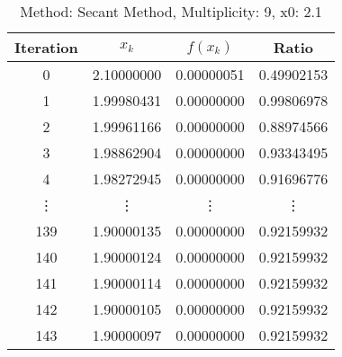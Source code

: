 \begin{table}
\centering
\caption{Method: Secant Method, Multiplicity: 9, x0: 2.1}
\label{tab:table_Secant_Method_9_2_1}
\begin{tabular}{c c c c}
\toprule
Iteration &      $x_k$ &   $f(x_k)$ &      Ratio \\
\midrule
        0 & 2.10000000 & 0.00000051 & 0.49902153 \\
        1 & 1.99980431 & 0.00000000 & 0.99806978 \\
        2 & 1.99961166 & 0.00000000 & 0.88974566 \\
        3 & 1.98862904 & 0.00000000 & 0.93343495 \\
        4 & 1.98272945 & 0.00000000 & 0.91696776 \\
   \vdots &     \vdots &     \vdots &     \vdots \\
      139 & 1.90000135 & 0.00000000 & 0.92159932 \\
      140 & 1.90000124 & 0.00000000 & 0.92159932 \\
      141 & 1.90000114 & 0.00000000 & 0.92159932 \\
      142 & 1.90000105 & 0.00000000 & 0.92159932 \\
      143 & 1.90000097 & 0.00000000 & 0.92159932 \\
\bottomrule
\end{tabular}
\end{table}

